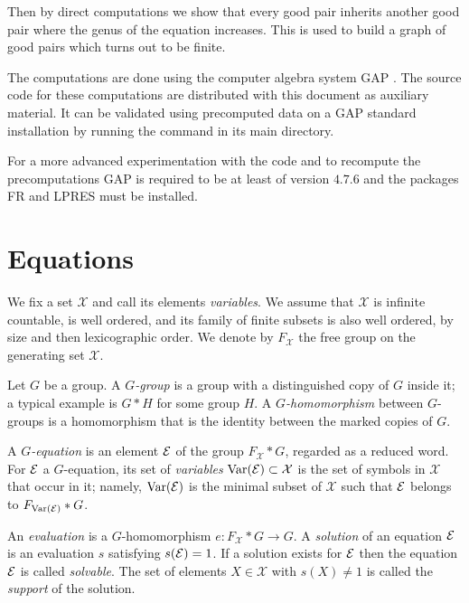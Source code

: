 \documentclass[a4paper,11pt]{amsart}
\begin{document}
Then by direct computations we show that every good pair inherits
another good pair where the genus of the equation increases.
This is used to build a graph of good pairs which turns out 
to be finite. 

The computations are done
 using the computer algebra system GAP \cite{GAP4}. The source
code for these computations are distributed with this document as
auxiliary material. It can be validated using precomputed data on a
GAP standard installation by running the command  in its main directory.

For a more advanced experimentation with the code and to recompute 
the precomputations GAP is required to be at least of version $4.7.6$
and the packages FR\cite{FR2.3.6} and 
LPRES\cite{LPRES0.3.0} must be installed.

\section{Equations}
We fix a set $\mathcal{X}$ and call its elements \emph{variables}.  We assume
that $\mathcal{X}$ is infinite countable, is well ordered, and its family of finite
subsets is also well ordered, by size and then lexicographic order. We
denote by $F_{\mathcal{X}}$ the free group on the generating set $\mathcal{X}$.

\begin{defi}
  Let $G$ be a group. A \emph{$G$-group} is a group with a
  distinguished copy of $G$ inside it; a typical example is 
  $G*H$ for some group $H$. A \emph{$G$-homomorphism} 
  between $G$-groups is a homomorphism
  that is the identity between the marked copies of $G$.

  A \emph{$G$-equation} is an element $\mathcal{E}$ of the group $F_{\mathcal{X}} * G$,
  regarded as a reduced word. For $\mathcal{E}$ a $G$-equation, its set of
  \emph{variables} $\textup{Var}(\mathcal{E})\subset \mathcal{X}$ is the set of symbols in $\mathcal{X}$
  that occur in it; namely, $\textup{Var}(\mathcal{E})$ is the minimal subset of $\mathcal{X}$
  such that $\mathcal{E}$ belongs to $F_{\textup{Var}(\mathcal{E})}*G$.

  An \emph{evaluation} is a $G$-homomorphism $e\colon F_{\mathcal{X}} * G \to G$.
  A \emph{solution} of an equation $\mathcal{E}$ is an evaluation $s$
  satisfying $s(\mathcal{E})=1$. If a solution exists for $\mathcal{E}$ then the
  equation $\mathcal{E}$ is called \emph{solvable}. The set of elements
  $X\in \mathcal{X}$ with $s(X)\neq 1$ is called the \emph{support} of the solution.
\end{defi}
\end{document}
